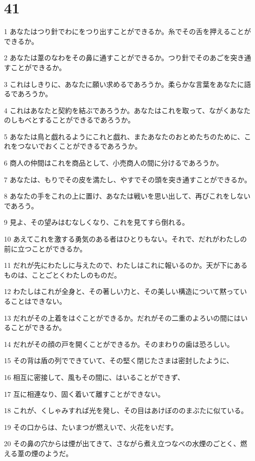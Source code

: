 \chapter{41}

\par 1 あなたはつり針でわにをつり出すことができるか。糸でその舌を押えることができるか。
\par 2 あなたは葦のなわをその鼻に通すことができるか。つり針でそのあごを突き通すことができるか。
\par 3 これはしきりに、あなたに願い求めるであろうか。柔らかな言葉をあなたに語るであろうか。
\par 4 これはあなたと契約を結ぶであろうか。あなたはこれを取って、ながくあなたのしもべとすることができるであろうか。
\par 5 あなたは鳥と戯れるようにこれと戯れ、またあなたのおとめたちのために、これをつないでおくことができるであろうか。
\par 6 商人の仲間はこれを商品として、小売商人の間に分けるであろうか。
\par 7 あなたは、もりでその皮を満たし、やすでその頭を突き通すことができるか。
\par 8 あなたの手をこれの上に置け、あなたは戦いを思い出して、再びこれをしないであろう。
\par 9 見よ、その望みはむなしくなり、これを見てすら倒れる。
\par 10 あえてこれを激する勇気のある者はひとりもない。それで、だれがわたしの前に立つことができるか。
\par 11 だれが先にわたしに与えたので、わたしはこれに報いるのか。天が下にあるものは、ことごとくわたしのものだ。
\par 12 わたしはこれが全身と、その著しい力と、その美しい構造について黙っていることはできない。
\par 13 だれがその上着をはぐことができるか。だれがその二重のよろいの間にはいることができるか。
\par 14 だれがその顔の戸を開くことができるか。そのまわりの歯は恐ろしい。
\par 15 その背は盾の列でできていて、その堅く閉じたさまは密封したように、
\par 16 相互に密接して、風もその間に、はいることができず、
\par 17 互に相連なり、固く着いて離すことができない。
\par 18 これが、くしゃみすれば光を発し、その目はあけぼののまぶたに似ている。
\par 19 その口からは、たいまつが燃えいで、火花をいだす。
\par 20 その鼻の穴からは煙が出てきて、さながら煮え立つなべの水煙のごとく、燃える葦の煙のようだ。
